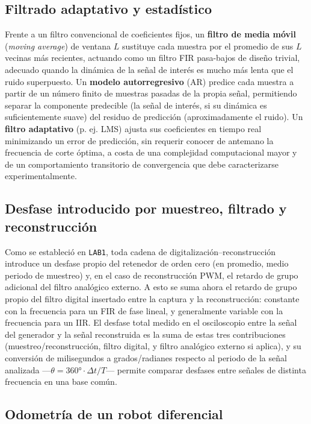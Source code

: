 \subsection{Filtrado adaptativo y estadístico}

Frente a un filtro convencional de coeficientes fijos, un \textbf{filtro de media móvil} (\emph{moving average}) de ventana $L$ sustituye cada muestra por el promedio de sus $L$ vecinas más recientes, actuando como un filtro FIR pasa-bajos de diseño trivial, adecuado quando la dinámica de la señal de interés es mucho más lenta que el ruido superpuesto. Un \textbf{modelo autorregresivo} (AR) predice cada muestra a partir de un número finito de muestras pasadas de la propia señal, permitiendo separar la componente predecible (la señal de interés, si su dinámica es suficientemente suave) del residuo de predicción (aproximadamente el ruido). Un \textbf{filtro adaptativo} (p. ej. LMS) ajusta sus coeficientes en tiempo real minimizando un error de predicción, sin requerir conocer de antemano la frecuencia de corte óptima, a costa de una complejidad computacional mayor y de un comportamiento transitorio de convergencia que debe caracterizarse experimentalmente.

\subsection{Desfase introducido por muestreo, filtrado y reconstrucción}

Como se estableció en \texttt{LAB1}, toda cadena de digitalización–reconstrucción introduce un desfase propio del retenedor de orden cero (en promedio, medio periodo de muestreo) y, en el caso de reconstrucción PWM, el retardo de grupo adicional del filtro analógico externo. A esto se suma ahora el retardo de grupo propio del filtro digital insertado entre la captura y la reconstrucción: constante con la frecuencia para un FIR de fase lineal, y generalmente variable con la frecuencia para un IIR. El desfase total medido en el osciloscopio entre la señal del generador y la señal reconstruida es la suma de estas tres contribuciones (muestreo/reconstrucción, filtro digital, y filtro analógico externo si aplica), y su conversión de milisegundos a grados/radianes respecto al periodo de la señal analizada —$\theta = 360° \cdot \Delta t / T$— permite comparar desfases entre señales de distinta frecuencia en una base común.

\subsection{Odometría de un robot diferencial}
\label{sec:odometria}

